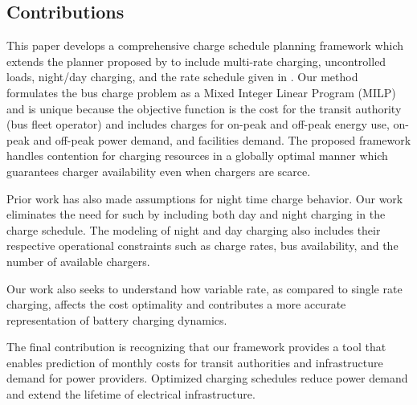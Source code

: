\subsection{Contributions}
This paper develops a comprehensive charge schedule planning framework which extends the planner proposed by \cite{whitaker_network_2021} to include multi-rate charging, uncontrolled loads, night/day charging, and the rate schedule given in \cite{noauthor_rocky_nodate}. Our method formulates the bus charge problem as a Mixed Integer Linear Program (MILP) and is unique because the objective function is the cost for the transit authority (bus fleet operator) and includes charges for on-peak and off-peak energy use, on-peak and off-peak power demand, and facilities demand. The proposed framework handles contention for charging resources in a globally optimal manner which guarantees charger availability even when chargers are scarce.
\par Prior work has also made assumptions for night time charge behavior. Our work eliminates the need for such by including both day and night charging in the charge schedule. The modeling of night and day charging also includes their respective operational constraints such as charge rates, bus availability, and the number of available chargers.
\par Our work also seeks to understand how variable rate, as compared to single rate charging, affects the cost optimality and contributes a more accurate representation of battery charging dynamics. 
\par The final contribution is recognizing that our framework provides a tool that enables prediction of monthly costs for transit authorities and infrastructure demand for power providers.  Optimized charging schedules reduce power demand and extend the lifetime of electrical infrastructure.

